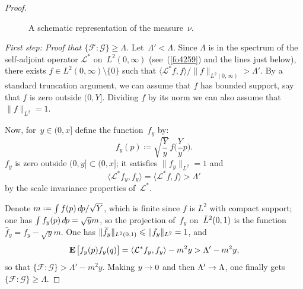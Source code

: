 \begin{proof}
\begin{figure}
%
\caption{A schematic representation of the measure~$\nu$.}%
\label{fig-nu}
\end{figure}

\noindent\textit{First step: Proof that $\{\mathcal{F}:\mathcal{G}\} \geq \Lambda$.}\quad
Let~$\Lambda' < \Lambda$.
Since $\Lambda$ is in the spectrum of the self-adjoint operator $\mathcal{L}^*$ on~$L^2(0,\infty)$
(see~(\ref{fo4259}) and the lines just below),
there exists $f \in L^2(0,\infty)\setminus\{0\}$
such that $\langle \mathcal{L}^*f,f \rangle / \|f\|_{L^2(0,\infty)} > \Lambda'$.
By a standard truncation argument, we can assume that $f$ has bounded support,
say that $f$ is zero outside $(0,Y]$.
Dividing $f$ by its norm we can also assume that $\|f\|_{L^2} = 1$.

Now, for~$y \in (0,x]$ define the function~$f_y$ by:
\[ f_y(p) \coloneqq \sqrt{\frac{Y}{y}} \, f \! \bigg(\frac{Y}{y}p\bigg) .\]
$f_y$ is zero outside $(0,y] \allowbreak {\subset (0,x]}$; it satisfies $\|f_y\|_{L^2} = 1$ and
\[ \langle \mathcal{L}^*f_y, f_y \rangle = \langle \mathcal{L}^*f,f \rangle > \Lambda' \]
by the scale invariance properties of~$\mathcal{L}^*$.

Denote $m \coloneqq \int f(p) \,\dx{p} / \sqrt{Y}$, which is finite since $f$ is $L^2$ with compact support;
one has $\int f_y(p) \,\dx{p} = \sqrt{y}m$,
so the projection of~$f_y$ on~$\ldb(0,1)$ is the function~$\bar{f}_y = f_y-\sqrt{y}m$.
One has $\|\bar{f}_y\|_{\ldb(0,1)} \leq \|f_y\|_{L^2} = 1$,
and
\[ \EE\big[ \bar{f}_y(p)\bar{f}_y(q) \big] = \langle \mathcal{L}^*f_y,f_y \rangle - m^2y
> \Lambda' - m^2y ,\]
so that $\{\mathcal{F}:\mathcal{G}\} > \Lambda' - m^2y$. Making $y \to 0$
and then $\Lambda' \to \Lambda$, one finally gets $\{\mathcal{F}:\mathcal{G}\} \geq \Lambda$.


\end{proof}

